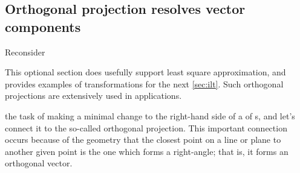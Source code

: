 %





\subsection{Orthogonal projection resolves vector components}
\label{sec:proj}


\begin{comment}
\cite[p.738]{HughesHallett2013} \pooliv{p.27--8}
onto a vector, parallel and perpendicular components, work done
\pooliv{p.382}
orthogonal projections onto subspace, orthogonal decomposition thm,
\end{comment}

Reconsider \begin{aside}
This optional section does usefully support least square approximation, and provides examples of transformations for the next \cref{sec:ilt}.
Such orthogonal projections are extensively used in applications.
\end{aside}%
the task of making a minimal change to the right-hand side of a  of s, and let's connect it to the so-called orthogonal projection.
This important connection occurs because of the geometry that the closest point on a line or plane to another given point is the one which forms a right-angle; that is, it forms an orthogonal vector.


